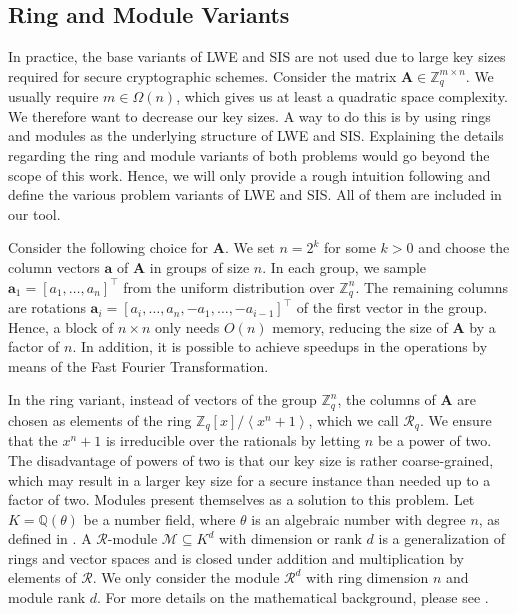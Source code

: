 

\subsection{Ring and Module Variants}\label{sec:ring-module}
In practice, the base variants of LWE and SIS are not used due to large key sizes required for secure cryptographic schemes. Consider the matrix $\mathbf{A} \in \mathbb{Z}_q^{m \times n}$. We usually require $m \in \Omega(n)$, which gives us at least a quadratic space complexity. We therefore want to decrease our key sizes. A way to do this is by using rings and modules as the underlying structure of LWE and SIS. Explaining the details regarding the ring and module variants of both problems would go beyond the scope of this work. Hence, we will only provide a rough intuition following \cite{Reg10} and define the various problem variants of LWE and SIS. All of them are included in our tool.

Consider the following choice for $\mathbf{A}$. We set $n=2^k$ for some $k > 0$ and choose the column vectors $\mathbf{a}$ of $\mathbf{A}$ in groups of size $n$. In each group, we sample $\mathbf{a}_1 = [a_1, \ldots, a_n]^\intercal$ from the uniform distribution over $\mathbb{Z}_q^{n}$. The remaining columns are rotations $\mathbf{a}_i = [a_i, \ldots, a_n, -a_1, \ldots, -a_{i-1}]^\intercal$ of the first vector in the group.
Hence, a block of $n\times n$ only needs $O(n)$ memory, reducing the size of $\mathbf{A}$ by a factor of $n$. In addition, it is possible to achieve speedups in the operations by means of the Fast Fourier Transformation.

In the ring variant, instead of vectors of the group $\mathbb{Z}_q^n$, the columns of $\mathbf{A}$ are chosen as elements of the ring $\mathbb{Z}_q\left[x\right] / \left\langle x^n + 1 \right\rangle$, which we call $\mathcal{R}_q$. We ensure that the  $x^n + 1$ is irreducible over the rationals by letting $n$ be a power of two. The disadvantage of powers of two is that our key size is rather coarse-grained, which may result in a larger key size for a secure instance than needed up to a factor of two. Modules present themselves as a solution to this problem. Let $K=\mathbb{Q}(\theta)$ be a number field, where $\theta$ is an algebraic number with degree $n$, as defined in \cite{LS15}. A $\mathcal{R}$-module $\mathcal{M} \subseteq K^d$ with dimension or rank $d$ is a generalization of rings and vector spaces and is closed under addition and multiplication by elements of $\mathcal{R}$. We only consider the module $\mathcal{R}^d$ with ring dimension $n$ and module rank $d$. For more details on the mathematical background, please see \cite{LS15}. %

